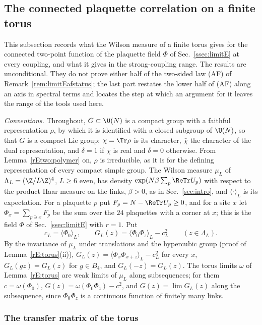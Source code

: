 \subsection{The connected plaquette correlation on a finite torus}
\label{ssec:rEtwo}

This subsection records what the Wilson measure of a finite torus gives for
the connected two-point function of the plaquette field $\Phi$ of
Sec.~\ref{ssec:limitE} at every coupling, and what it gives in the
strong-coupling range. The results are unconditional. They do not prove
either half of the two-sided law (AF) of Remark~\ref{rem:limitEafstatus};
the last part restates the lower half of (AF) along an axis in spectral
terms and locates the step at which an argument for it leaves the range
of the tools used here.

\emph{Conventions.} Throughout, $G\subset\U(N)$ is a compact group with a
faithful representation $\rho$, by which it is identified with a closed
subgroup of $\U(N)$, so that $G$ is a compact Lie group; $\chi=\Tr\rho$ is
its character, $\bar\chi$ the character of the dual representation, and
$\delta=1$ if $\chi$ is real and $\delta=0$ otherwise. From
Lemma~\ref{rEtwo:polymer} on, $\rho$ is irreducible, as it is for the
defining representation of every compact simple group. The Wilson measure
$\mu_L$ of $\Lambda_L=(\Z/L\Z)^4$, $L\ge6$ even, has density
$\exp(N\beta\sum_p\ReTr U_p)$ with respect to the product Haar measure on
the links, $\beta>0$, as in Sec.~\ref{sec:intro}, and $\langle\cdot
\rangle_L$ is its expectation. For a plaquette $p$ put $F_p=N-\ReTr U_p
\ge0$, and for a site $x$ let $\Phi_x=\sum_{p\ni x}F_p$ be the sum over the
$24$ plaquettes with a corner at $x$; this is the field $\Phi$ of
Sec.~\ref{ssec:limitE} with $r=1$. Put
\[
c_L=\langle\Phi_0\rangle_L,\qquad G_L(z)=\langle\Phi_0\Phi_z\rangle_L-c_L^2
\qquad(z\in\Lambda_L).
\]
By the invariance of $\mu_L$ under translations and the hypercubic group
(proof of Lemma~\ref{rE:torus}(ii)), $G_L(z)=\langle\Phi_x\Phi_{x+z}
\rangle_L-c_L^2$ for every $x$, $G_L(gz)=G_L(z)$ for $g\in B_4$, and
$G_L(-z)=G_L(z)$. The torus limits $\omega$ of Lemma~\ref{rE:torus} are
weak limits of $\mu_L$ along subsequences; for them $c=\omega(\Phi_0)$,
$G(z)=\omega(\Phi_0\Phi_z)-c^2$, and $G(z)=\lim G_{L}(z)$ along the
subsequence, since $\Phi_0\Phi_z$ is a continuous function of finitely
many links.

\subsubsection{The transfer matrix of the torus}

